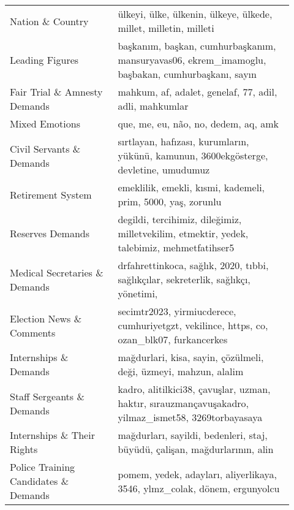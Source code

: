 \begin{table}
\begin{tabular}{|>{\hspace{0pt}}m{0.35\linewidth}|>{\hspace{0pt}}m{0.575\linewidth}|}
  Nation \& Country                             & ülkeyi, ülke, ülkenin, ülkeye, ülkede, millet, milletin, milleti                                                            \\
  Leading Figures                                & başkanım, başkan, cumhurbaşkanım, mansuryavas06, ekrem\_imamoglu, başbakan, cumhurbaşkanı, sayın                     \\
  Fair Trial \& Amnesty Demands        & mahkum, af, adalet, genelaf, 77, adil, adli, mahkumlar                                                                    \\
  Mixed Emotions                                 & que, me, eu, não, no, dedem, aq, amk                                                                                            \\
  Civil Servants \& Demands               & sırtlayan, hafızası, kurumların, yükünü, kamunun, 3600ekgösterge, devletine, umudumuz                                 \\
  Retirement System                              & emeklilik, emekli, kısmi, kademeli, prim, 5000, yaş, zorunlu                                                                    \\
  Reserves Demands               & degildi, tercihimiz, dileğimiz, milletvekilim, etmektir, yedek, talebimiz, mehmetfatihser5                             \\
  Medical Secretaries \& Demands          & drfahrettinkoca, sağlık, 2020, tıbbi, sağlıkçılar, sekreterlik, sağlıkçı, yönetimi,                         \\
  Election News \& Comments                     & secimtr2023, yirmiucderece, cumhuriyetgzt, vekilince, https, co, ozan\_blk07, furkancerkes                   \\
  Internships \& Demands      & mağdurlari, kisa, sayin, çözülmeli, deği, üzmeyi, mahzun, alalim                                                         \\
  Staff Sergeants \& Demands                & kadro, alitilkici38, çavuşlar, uzman, haktır, sırauzmançavuşakadro, yilmaz\_ismet58, 3269torbayasaya    \\
  Internships \& Their Rights & mağdurları, sayildi, bedenleri, staj, büyüdü, çalişan, mağdurlarının, alin                                             \\
  Police Training Candidates \& Demands            & pomem, yedek, adayları, aliyerlikaya, 3546, ylmz\_colak, dönem, ergunyolcu                                 \\

\end{tabular}
\end{table}

